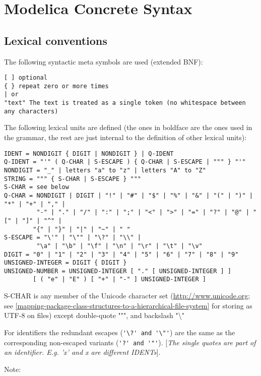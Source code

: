 \chapter{Modelica Concrete Syntax}
\section{Lexical conventions}

The following syntactic meta symbols are used (extended BNF):
\begin{lstlisting}[language=grammar]
[ ] optional
{ } repeat zero or more times
| or
"text" The text is treated as a single token (no whitespace between any characters)
\end{lstlisting}

The following lexical units are defined (the ones in boldface are the
ones used in the grammar, the rest are just internal to the definition
of other lexical units):

\begin{lstlisting}[language=grammar]
IDENT = NONDIGIT { DIGIT | NONDIGIT } | Q-IDENT
Q-IDENT = "'" ( Q-CHAR | S-ESCAPE ) { Q-CHAR | S-ESCAPE | """ } "'"
NONDIGIT = "_" | letters "a" to "z" | letters "A" to "Z"
STRING = """ { S-CHAR | S-ESCAPE } """
S-CHAR = see below
Q-CHAR = NONDIGIT | DIGIT | "!" | "#" | "$" | "%" | "&" | "(" | ")" | "*" | "+" | "," |
         "-" | "." | "/" | ":" | ";" | "<" | ">" | "=" | "?" | "@" | "[" | "]" | "^" |
        "{" | "}" | "|" | "~" | " "
S-ESCAPE = "\'" | "\"" | "\?" | "\\" |
         "\a" | "\b" | "\f" | "\n" | "\r" | "\t" | "\v"
DIGIT = "0" | "1" | "2" | "3" | "4" | "5" | "6" | "7" | "8" | "9"
UNSIGNED-INTEGER = DIGIT { DIGIT }
UNSIGNED-NUMBER = UNSIGNED-INTEGER [ "." [ UNSIGNED-INTEGER ] ]
        [ ( "e" | "E" ) [ "+" | "-" ] UNSIGNED-INTEGER ]
\end{lstlisting}
\textrm{S-CHAR} is any member of the Unicode character set
(\url{http://www.unicode.org}; see \autoref{mapping-package-class-structures-to-a-hierarchical-file-system} for storing as UTF-8 on files) except double-quote """, and backslash "\textbackslash{}"

For identifiers the redundant escapes (\lstinline!'\?' and '\"'!) are the same as the corresponding non-escaped
variants (\lstinline!'?' and '"'!). {[}\emph{The single quotes are part of an
identifier. E.g. 'x' and x are different IDENTs}{]}.

Note:

